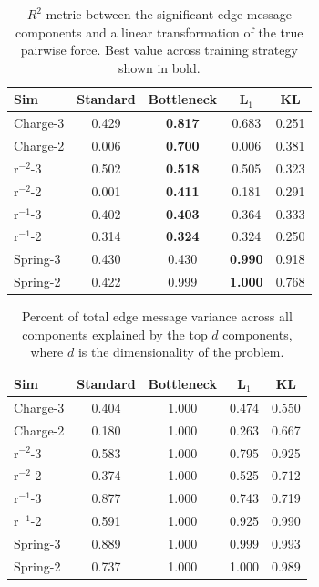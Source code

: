 \documentclass[11pt]{article}
\begin{document}
    \begin{table}[H]
        \centering
        \begin{tabular}{lcccc}
        \hline
        Sim & Standard & Bottleneck & L$_1$ & KL \\
        \hline
        Charge-3 & 0.429 & \textbf{0.817} & 0.683 & 0.251 \\
        Charge-2 & 0.006 & \textbf{0.700} & 0.006 & 0.381 \\
        r$^{-2}$-3 & 0.502 & \textbf{0.518} & 0.505 & 0.323 \\
        r$^{-2}$-2 & 0.001 & \textbf{0.411} & 0.181 & 0.291 \\
        r$^{-1}$-3 & 0.402 & \textbf{0.403} & 0.364 & 0.333 \\
        r$^{-1}$-2 & 0.314 & \textbf{0.324} & 0.324 & 0.250 \\
        Spring-3 & 0.430 & 0.430 & \textbf{0.990} & 0.918 \\
        Spring-2 & 0.422 & 0.999 & \textbf{1.000} & 0.768 \\

        \hline
        \end{tabular}
        \caption{$R^2$ metric between the significant edge message components and a linear transformation of the true pairwise force. Best value across training strategy shown in bold.}
        \label{tab:metrics_comparison}
    \end{table}
    \begin{table}[H]
        \centering
        \begin{tabular}{lcccc}
        \hline
        Sim & Standard & Bottleneck & L$_1$ & KL \\
        \hline
        Charge-3 & 0.404 & 1.000 & 0.474 & 0.550 \\
        Charge-2 & 0.180 & 1.000 & 0.263 & 0.667 \\
        r$^{-2}$-3 & 0.583 & 1.000 & 0.795 & 0.925 \\
        r$^{-2}$-2 & 0.374 & 1.000 & 0.525 & 0.712 \\
        r$^{-1}$-3 & 0.877 & 1.000 & 0.743 & 0.719 \\
        r$^{-1}$-2 & 0.591 & 1.000 & 0.925 & 0.990 \\
        Spring-3 & 0.889 & 1.000 & 0.999  & 0.993 \\
        Spring-2 & 0.737 & 1.000 & 1.000 & 0.989 \\
        \hline
        \end{tabular}
        \caption{Percent of total edge message variance across all components explained by the top $d$ components, where $d$ is the dimensionality of the problem.}
        \label{tab:metrics_comparison}
    \end{table}
\end{document}
